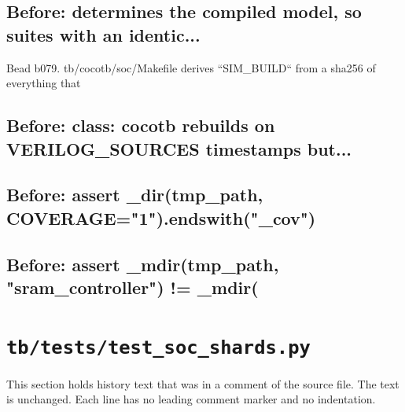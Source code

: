 \begin{record}

\subsection*{Before: determines the compiled model, so suites with an identic...}

\begin{textblock}
Bead b079.  tb/cocotb/soc/Makefile derives ``SIM_BUILD`` from a sha256 of everything that
\end{textblock}

\subsection*{Before: class: cocotb rebuilds on VERILOG\_SOURCES timestamps but...}


\subsection*{Before: assert \_dir(tmp\_path, COVERAGE="1").endswith("\_cov")}


\subsection*{Before: assert \_mdir(tmp\_path, "sram\_controller") != \_mdir(}


\end{record}

\section{\texttt{tb/tests/test\_soc\_shards.py}}\label{cr:suite:test-soc-shards}

This section holds history text that was in a comment of the source file. The text is unchanged. Each line has no leading comment marker and no indentation.

